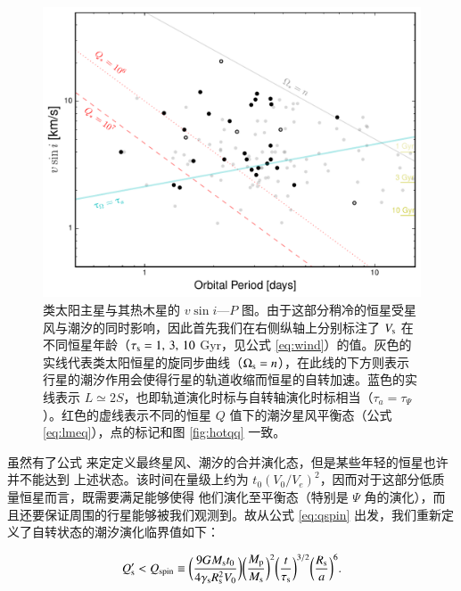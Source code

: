 \begin{figure}[t]
\centering
\includegraphics[width=1.0\textwidth]{figures/chapter4/fig10a_cold.pdf}
\caption{类太阳主星与其热木星的 $v\sin i $---$P$ 图。由于这部分稍冷的恒星受星风与潮汐的同时影响，因此首先我们在右侧纵轴上分别标注了 $V_\mathrm{s}$ 在不同恒星年龄（$\tau_\mathrm{s} = 1,\,3,\,10$ Gyr，见公式 \ref{eq:wind}）的值。灰色的实线代表类太阳恒星的旋同步曲线（$\Omega_\mathrm{s} = n$），在此线的下方则表示行星的潮汐作用会使得行星的轨道收缩而恒星的自转加速。蓝色的实线表示 $L \simeq 2S$，也即轨道演化时标与自转轴演化时标相当（$\tau_a = \tau_\Psi$）。红色的虚线表示不同的恒星 $Q$ 值下的潮汐星风平衡态（公式 \ref{eq:lmeq}），点的标记和图 \ref{fig:hotqq} 一致。}
\label{fig:coldevo}
\end{figure}

虽然有了公式 \label{eq:lmeq} 来定定义最终星风、潮汐的合并演化态，但是某些年轻的恒星也许并不能达到
上述状态。该时间在量级上约为 $t_0(V_0/V_e)^2$，因而对于这部分低质量恒星而言，既需要满足能够使得
他们演化至平衡态（特别是 $\Psi$ 角的演化），而且还要保证周围的行星能够被我们观测到。故从公式 
\ref{eq:qspin} 出发，我们重新定义了自转状态的潮汐演化临界值如下：

\begin{equation} \label{eq:lmqspin}
Q_\mathrm{s}^{\prime} < Q_\mathrm{spin} \equiv \bigg( 
\frac{9G M_\mathrm{s}t_0}{4 \gamma_\mathrm{s}R_\mathrm{s}^2V_0} \bigg) 
\bigg( \frac{M_\mathrm{p}}{M_\mathrm{s}} \bigg)^2  
\bigg( \frac{t}{\tau_\mathrm{s}} \bigg)^{3/2} \bigg( \frac{R_\mathrm{s}}{a} \bigg)^6.
\end{equation} 

